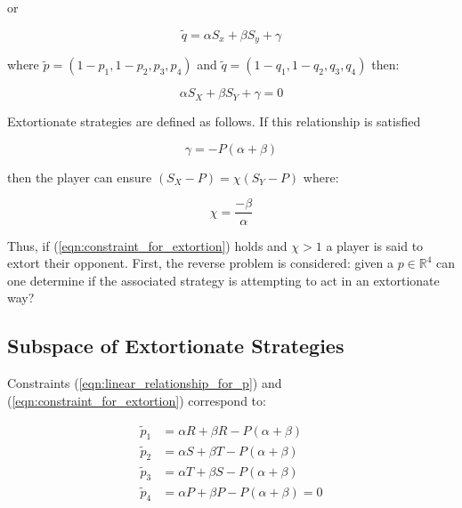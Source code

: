 \documentclass[a4paper]{article}
\begin{document}
or

\begin{equation}\label{eqn:linear_relationship_for_q}
    \tilde q=\alpha S_x + \beta S_y + \gamma
\end{equation}

 where \(\tilde p = (1 - p_1, 1 - p_2, p_3, p_4)\) and
\(\tilde q = (1 - q_1, 1 - q_2, q_3, q_4)\) then:

\begin{equation}
    \alpha S_X + \beta S_Y + \gamma = 0
\end{equation}

Extortionate strategies are defined as follows. If this relationship is
satisfied

\begin{equation}\label{eqn:constraint_for_extortion}
    \gamma = - P(\alpha + \beta)
\end{equation}

then the player can ensure \((S_X - P)=\chi(S_Y-P)\) where:

\begin{equation}\label{eqn:definition_of_chi}
    \chi=\frac{-\beta}{\alpha}
\end{equation}

\noindent Thus, if (\ref{eqn:constraint_for_extortion}) holds and \(\chi >1\) a player is
said to extort their opponent.
First, the reverse problem is considered: given a
\(p\in\mathbb{R}^4\) can one determine if the associated strategy is attempting
to act in an extortionate way?

\subsection{Subspace of Extortionate Strategies}

Constraints (\ref{eqn:linear_relationship_for_p}) and
(\ref{eqn:constraint_for_extortion}) correspond to:

\begin{align}
    \tilde p_1 & = \alpha R + \beta R - P (\alpha + \beta)
            \label{eqn:condition_for_tilde_p1}\\
    \tilde p_2 & = \alpha S + \beta T - P (\alpha + \beta)
            \label{eqn:condition_for_tilde_p2}\\
    \tilde p_3 & = \alpha T + \beta S - P (\alpha + \beta)
            \label{eqn:condition_for_tilde_p3}\\
    \tilde p_4 & = \alpha P + \beta P - P (\alpha + \beta) = 0
            \label{eqn:condition_for_tilde_p4}
\end{align}
\end{document}
